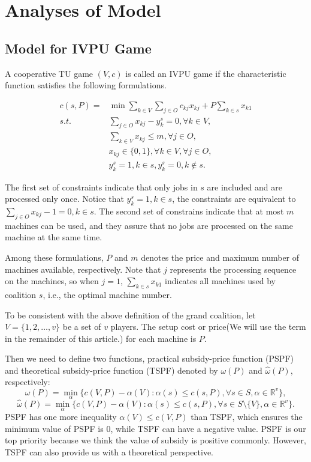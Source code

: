 \section{Analyses of Model}

\subsection{Model for IVPU Game}

A cooperative TU game $(V,c)$ is called an IVPU game if the characteristic function satisfies the following formulations.

\[
\begin{aligned}
c(s,P) = & {\min} \sum_{k\in V}\sum_{j\in O} {c_{kj} x_{kj}} + {P\sum_{k\in s} x_{k1}} \\
{s.t.}\quad & \sum_{j \in O} x_{kj}-y_k^s=0, \forall k \in V, \\
& \sum_{k\in V} x_{kj} \leq m,\forall j \in O,  \\
& x_{kj} \in \{0,1\} , \forall k \in V, \forall j \in O,\\
& y_k^s=1, k \in s, y_k^s=0, k \notin s.
\end{aligned}
\]

The first set of constraints indicate that only jobs in $s$ are included and are processed only once.
Notice that $ y_k^s=1, k \in s$, the constraints are equivalent to $\sum_{j \in O} x_{kj}-1=0, k \in s$.
The second set of constrains indicate that at most $m$
machines can be used, and they assure that no jobs are processed on the same machine at the same time.

Among these formulations, $P$ and $m$ denotes the price and maximum number of machines available, respectively. Note that $j$ represents the processing sequence on the machines, so when $j=1$, $\sum_{k\in s} x_{k1}$ indicates all machines used by coalition $s$, i.e., the optimal machine number.

To be consistent with the above definition of the grand coalition, let $V=\{1,2,\ldots,v\}$ be a set of $v$ players. The setup cost or price(We will use the term in the remainder of this article.) for each machine is $P$.


Then we need to define two functions, practical subsidy-price function (PSPF) and theoretical subsidy-price function (TSPF) denoted by $\omega(P)$ and $\hat{\omega}(P)$, respectively:
\[
  {\omega(P)}=\mathop{\min}_{\alpha}\{c(V,P)-\alpha(V): \alpha(s) \leq c(s,P)
 ,\forall s \in S, \alpha\in\mathbb{R}^{v}\},
\]
\[
  {\hat{\omega}(P)}=\mathop{\min}_{\alpha}\{c(V,P)-\alpha(V): \alpha(s) \leq c(s,P)
 ,\forall s \in S\setminus\{V\}, \alpha\in\mathbb{R}^{v}\}.
\]
PSPF has one more inequality $\alpha(V)\leq c(V,P)$ than TSPF, which ensures the minimum value of PSPF is 0, while TSPF can have a negative value. PSPF is our top priority because we think the value of subsidy is positive commonly. However, TSPF can also provide us with a theoretical perspective.

